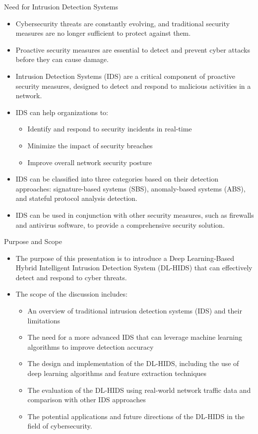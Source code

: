 \documentclass{beamer}
\begin{document}
\begin{frame}{Need for Intrusion Detection Systems}
  \begin{itemize}
    \item Cybersecurity threats are constantly evolving, and traditional security measures are no longer sufficient to protect against them.
    \item Proactive security measures are essential to detect and prevent cyber attacks before they can cause damage.
    \item Intrusion Detection Systems (IDS) are a critical component of proactive security measures, designed to detect and respond to malicious activities in a network.
    \item IDS can help organizations to:
      \begin{itemize}
        \item Identify and respond to security incidents in real-time
        \item Minimize the impact of security breaches
        \item Improve overall network security posture
      \end{itemize}
    \item IDS can be classified into three categories based on their detection approaches: signature-based systems (SBS), anomaly-based systems (ABS), and stateful protocol analysis detection.
    \item IDS can be used in conjunction with other security measures, such as firewalls and antivirus software, to provide a comprehensive security solution.
  \end{itemize}
\end{frame}


\begin{frame}{Purpose and Scope}
  \begin{itemize}
    \item The purpose of this presentation is to introduce a Deep Learning-Based Hybrid Intelligent Intrusion Detection System (DL-HIDS) that can effectively detect and respond to cyber threats.
    \item The scope of the discussion includes:
      \begin{itemize}
        \item An overview of traditional intrusion detection systems (IDS) and their limitations
        \item The need for a more advanced IDS that can leverage machine learning algorithms to improve detection accuracy
        \item The design and implementation of the DL-HIDS, including the use of deep learning algorithms and feature extraction techniques
        \item The evaluation of the DL-HIDS using real-world network traffic data and comparison with other IDS approaches
        \item The potential applications and future directions of the DL-HIDS in the field of cybersecurity.
      \end{itemize}
  \end{itemize}
\end{frame}
\end{document}
